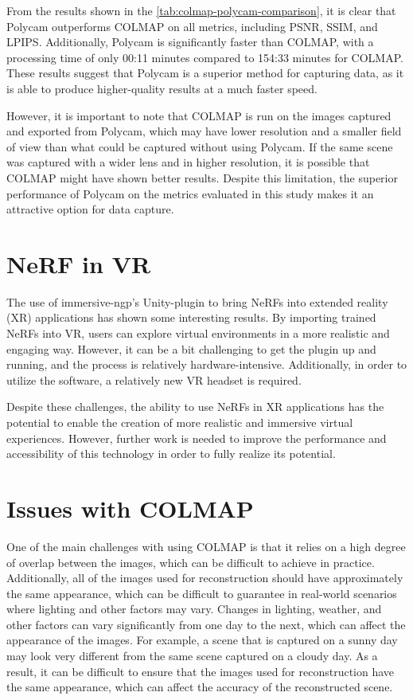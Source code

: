 From the results shown in the \autoref{tab:colmap-polycam-comparison}, it is clear that Polycam outperforms COLMAP on all metrics, including PSNR, SSIM, and LPIPS. Additionally, Polycam is significantly faster than COLMAP, with a processing time of only 00:11 minutes compared to 154:33 minutes for COLMAP. These results suggest that Polycam is a superior method for capturing data, as it is able to produce higher-quality results at a much faster speed.

However, it is important to note that COLMAP is run on the images captured and exported from Polycam, which may have lower resolution and a smaller field of view than what could be captured without using Polycam. If the same scene was captured with a wider lens and in higher resolution, it is possible that COLMAP might have shown better results. Despite this limitation, the superior performance of Polycam on the metrics evaluated in this study makes it an attractive option for data capture.

\section{NeRF in VR}
The use of immersive-ngp's Unity-plugin to bring NeRFs into extended reality (XR) applications has shown some interesting results. By importing trained NeRFs into VR, users can explore virtual environments in a more realistic and engaging way. However, it can be a bit challenging to get the plugin up and running, and the process is relatively hardware-intensive. Additionally, in order to utilize the software, a relatively new VR headset is required.

Despite these challenges, the ability to use NeRFs in XR applications has the potential to enable the creation of more realistic and immersive virtual experiences. However, further work is needed to improve the performance and accessibility of this technology in order to fully realize its potential.


\section{Issues with COLMAP}
One of the main challenges with using COLMAP is that it relies on a high degree of overlap between the images, which can be difficult to achieve in practice. Additionally, all of the images used for reconstruction should have approximately the same appearance, which can be difficult to guarantee in real-world scenarios where lighting and other factors may vary. Changes in lighting, weather, and other factors can vary significantly from one day to the next, which can affect the appearance of the images. For example, a scene that is captured on a sunny day may look very different from the same scene captured on a cloudy day. As a result, it can be difficult to ensure that the images used for reconstruction have the same appearance, which can affect the accuracy of the reconstructed scene.

